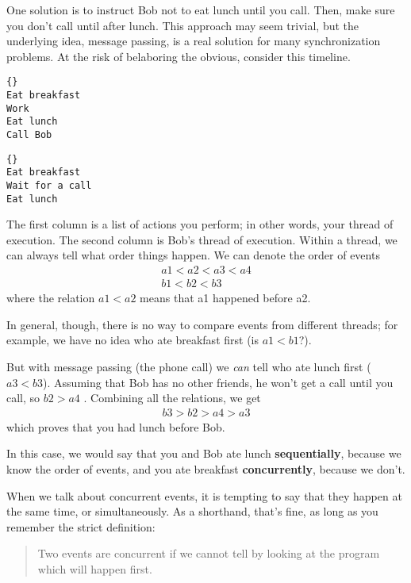 \documentclass{book}
\begin{document}
One solution is to instruct Bob not to eat lunch until you call.
Then, make sure you don't call until after lunch.  This approach may
seem trivial, but the underlying idea, message passing, is a real
solution for many synchronization problems.
At the risk of belaboring the obvious, consider this timeline.
%
\begin{minipage}[t]{2in}
\begin{lstlisting}[title={Thread A (You)}]{}
Eat breakfast 
Work          
Eat lunch     
Call Bob
\end{lstlisting}
\end{minipage}
\hfill
\begin{minipage}[t]{2in}
\begin{lstlisting}[title={Thread B (Bob)}]{}
Eat breakfast
Wait for a call
Eat lunch
\end{lstlisting}
\end{minipage}
%
The first column is a list of actions you perform; in other words,
your thread of execution.  The second column is Bob's thread of
execution.  Within a thread, we can always tell what order things
happen.  We can denote the order of events
%
\begin{eqnarray*}
a1 < a2 < a3 < a4  \\
b1 < b2 < b3
\end{eqnarray*}
%
where the relation $a1 < a2$ means that a1 happened before a2.

In general, though, there is no way to compare events from different
threads; for example, we have no idea who ate breakfast first (is $a1
< b1$?).

But with message passing (the phone call) we {\em can} tell who ate
lunch first ($a3 < b3$).  Assuming that Bob has no other friends, he
won't get a call until you call, so $b2 > a4$ .  Combining all the
relations, we get
%
\begin{eqnarray*}
b3 > b2 > a4 > a3
\end{eqnarray*}
%
which proves that you had lunch before Bob.

In this case, we would say that you and Bob ate lunch
{\bf sequentially}, because we know the order of events, and you
ate breakfast {\bf concurrently}, because we don't.

When we talk about concurrent events, it is tempting to say
that they happen at the same time, or simultaneously.  As a
shorthand, that's fine, as long as you remember the strict
definition:

\begin{quote}
Two events are concurrent if we cannot tell by looking at
the program which will happen first.
\end{quote}
\end{document}
